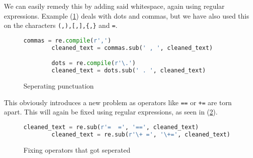     We can easily remedy this by adding said whitespace, again using
    regular expressions.  Example (\ref{fig:puncts}) deals with
    dots and commas, but we have also used this on the characters
    \verb+(,),[,],{,}+ and \verb+=+.

    \begin{figure}[htpb]
      \centering \begin{lstlisting}[language=Python]
        commas = re.compile(r',')
        cleaned_text = commas.sub(' , ', cleaned_text)

        dots = re.compile(r'\.') 
        cleaned_text = dots.sub(' . ', cleaned_text)
      \end{lstlisting} \caption{Seperating punctuation} \label{fig:puncts}
    \end{figure}

    This obviously introduces a new problem as operators like \verb+==+
    or \verb|+=| are torn apart. This will again be fixed using regular expressions,
    as seen in (\ref{fig:operators}).

    \begin{figure}[htpb]
      \centering
      \begin{lstlisting}[language=Python]
        cleaned_text = re.sub(r'=  =', '==', cleaned_text)                                                                │                                                                                                        
        cleaned_text = re.sub(r'\+ =', '\+=', cleaned_text)
      \end{lstlisting}
      \caption{Fixing operators that got seperated}
      \label{fig:operators}
    \end{figure}
